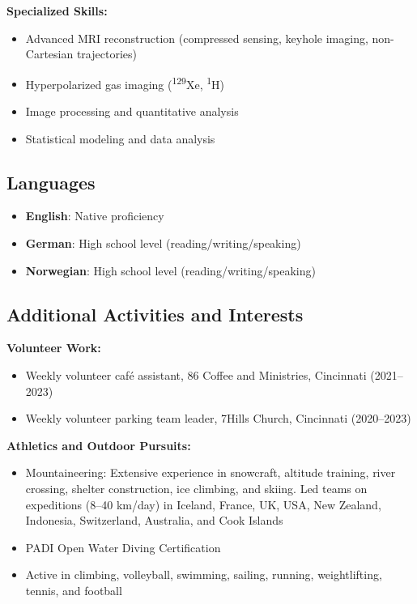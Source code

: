 \documentclass[11pt,]{scrartcl}
\begin{document}
\textbf{Specialized Skills:}
\begin{itemize}
  \leftskip-0.25in
    \item Advanced MRI reconstruction (compressed sensing, keyhole imaging, non-Cartesian trajectories)
    \item Hyperpolarized gas imaging (\textsuperscript{129}Xe, \textsuperscript{1}H)
    \item Image processing and quantitative analysis
    \item Statistical modeling and data analysis
\end{itemize}

\subsection{Languages}

\begin{itemize}
  \leftskip-0.25in
    \item \textbf{English}: Native proficiency
    \item \textbf{German}: High school level (reading/writing/speaking)
    \item \textbf{Norwegian}: High school level (reading/writing/speaking)
\end{itemize}

\subsection{Additional Activities and Interests}

\textbf{Volunteer Work:}
\begin{itemize}
  \leftskip-0.25in
  \item Weekly volunteer café assistant, 86 Coffee and Ministries, Cincinnati (2021--2023)
  \item Weekly volunteer parking team leader, 7Hills Church, Cincinnati (2020--2023)
\end{itemize}

\textbf{Athletics and Outdoor Pursuits:}
\begin{itemize}
  \leftskip-0.25in
  \item Mountaineering: Extensive experience in snowcraft, altitude training, river crossing, shelter construction, ice climbing, and skiing. Led teams on expeditions (8--40 km/day) in Iceland, France, UK, USA, New Zealand, Indonesia, Switzerland, Australia, and Cook Islands
  \item PADI Open Water Diving Certification
  \item Active in climbing, volleyball, swimming, sailing, running, weightlifting, tennis, and football
\end{itemize}
\end{document}
